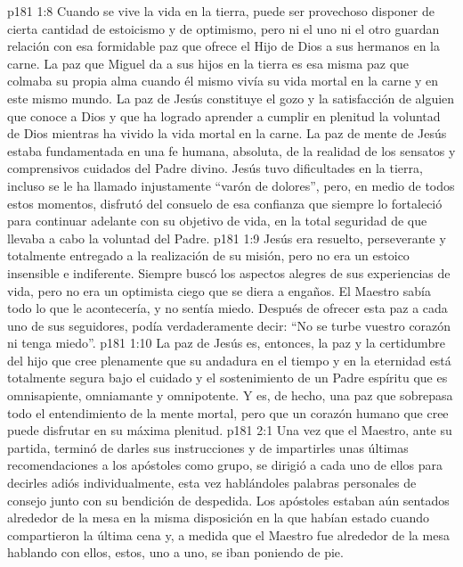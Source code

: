 \vs p181 1:8 Cuando se vive la vida en la tierra, puede ser provechoso disponer de cierta cantidad de estoicismo y de optimismo, pero ni el uno ni el otro guardan relación con esa formidable paz que ofrece el Hijo de Dios a sus hermanos en la carne. La paz que Miguel da a sus hijos en la tierra es esa misma paz que colmaba su propia alma cuando él mismo vivía su vida mortal en la carne y en este mismo mundo. La paz de Jesús constituye el gozo y la satisfacción de alguien que conoce a Dios y que ha logrado aprender a cumplir en plenitud la voluntad de Dios mientras ha vivido la vida mortal en la carne. La paz de mente de Jesús estaba fundamentada en una fe humana, absoluta, de la realidad de los sensatos y comprensivos cuidados del Padre divino. Jesús tuvo dificultades en la tierra, incluso se le ha llamado injustamente “varón de dolores”, pero, en medio de todos estos momentos, disfrutó del consuelo de esa confianza que siempre lo fortaleció para continuar adelante con su objetivo de vida, en la total seguridad de que llevaba a cabo la voluntad del Padre.
\vs p181 1:9 Jesús era resuelto, perseverante y totalmente entregado a la realización de su misión, pero no era un estoico insensible e indiferente. Siempre buscó los aspectos alegres de sus experiencias de vida, pero no era un optimista ciego que se diera a engaños. El Maestro sabía todo lo que le acontecería, y no sentía miedo. Después de ofrecer esta paz a cada uno de sus seguidores, podía verdaderamente decir: “No se turbe vuestro corazón ni tenga miedo”.
\vs p181 1:10 La paz de Jesús es, entonces, la paz y la certidumbre del hijo que cree plenamente que su andadura en el tiempo y en la eternidad está totalmente segura bajo el cuidado y el sostenimiento de un Padre espíritu que es omnisapiente, omniamante y omnipotente. Y es, de hecho, una paz que sobrepasa todo el entendimiento de la mente mortal, pero que un corazón humano que cree puede disfrutar en su máxima plenitud.
\vs p181 2:1 Una vez que el Maestro, ante su partida, terminó de darles sus instrucciones y de impartirles unas últimas recomendaciones a los apóstoles como grupo, se dirigió a cada uno de ellos para decirles adiós individualmente, esta vez hablándoles palabras personales de consejo junto con su bendición de despedida. Los apóstoles estaban aún sentados alrededor de la mesa en la misma disposición en la que habían estado cuando compartieron la última cena y, a medida que el Maestro fue alrededor de la mesa hablando con ellos, estos, uno a uno, se iban poniendo de pie.
